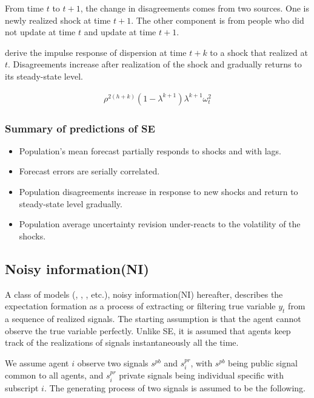 \documentclass[12pt]{article}
\begin{document}
	From time $t$ to $t+1$, the change in disagreements comes from two sources. One is newly realized shock at time $t+1$. The other component is from people who did not update at time $t$ and update at time $t+1$.  
	
\citet{coibion2012can} derive the impulse response of dispersion at time $t+k$ to a shock that realized at $t$. Disagreements increase after realization of the shock and gradually returns to its steady-state level.  
	
	\begin{eqnarray}
		\rho^{2(h+k)} (1-\lambda^{k+1})\lambda^{k+1} \omega^2_t
	\end{eqnarray}
	
	\subsubsection{Summary of predictions of SE}
	
	\begin{itemize}
		\item Population's mean forecast partially responds to shocks and with lags. 
		\item Forecast errors are serially correlated. 
		\item Population disagreements increase in response to new shocks and return to steady-state level gradually. 
		\item Population average uncertainty revision under-reacts to the volatility of the shocks.
	\end{itemize}
	
	\subsection{Noisy information(NI)}
	
	A class of models (\citet{lucas1972expectations}, \citet{sims2003implications}, \cite{woodford2001imperfect}, etc.), noisy information(NI) hereafter, describes the expectation formation as a process of extracting or filtering true variable $y_t$ from a sequence of realized signals.  The starting assumption is that the agent cannot observe the true variable perfectly. Unlike SE, it is assumed that agents keep track of the realizations of signals instantaneously all the time. 
	
	We assume agent $i$ observe two signals $s^{pb}$ and $s^{pr}_i$, with $s^{pb}$ being public signal common to all agents, and $s^{pr}_i$ private signals being individual specific with subscript $i$. The generating process of two signals is assumed to be the following.
	
\end{document}
